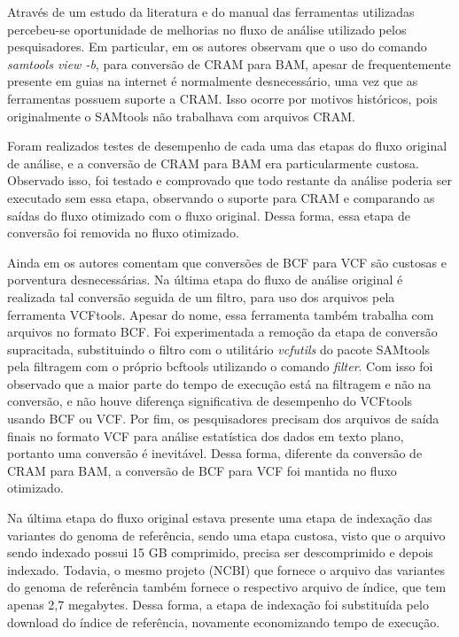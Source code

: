 \documentclass[cic,tc]{iiufrgs}
\begin{document}
Através de um estudo da literatura e do manual das ferramentas utilizadas
percebeu-se oportunidade de melhorias no fluxo de análise utilizado pelos
pesquisadores. Em particular, em \cite{danecek2021twelve} os autores observam
que o uso do comando \textit{samtools view -b}, para conversão de CRAM para
BAM, apesar de frequentemente presente em guias na internet é normalmente
desnecessário, uma vez que as ferramentas possuem suporte a CRAM. Isso ocorre
por motivos históricos, pois originalmente o SAMtools não trabalhava com
arquivos CRAM.\cite{danecek2021twelve}

Foram realizados testes de desempenho de cada uma das etapas do fluxo original
de análise, e a conversão de CRAM para BAM era particularmente custosa.
Observado isso, foi testado e comprovado que todo restante da análise poderia
ser executado sem essa etapa, observando o suporte para CRAM e comparando as
saídas do fluxo otimizado com o fluxo original. Dessa forma, essa etapa de
conversão foi removida no fluxo otimizado.

Ainda em \cite{danecek2021twelve} os autores comentam que conversões de BCF
para VCF são custosas e porventura desnecessárias. Na última etapa do fluxo de
análise original é realizada tal conversão seguida de um filtro, para uso dos
arquivos pela ferramenta VCFtools. Apesar do nome, essa ferramenta também
trabalha com arquivos no formato BCF.\cite{man2015vcftools} Foi experimentada a
remoção da etapa de conversão supracitada, substituindo o filtro com o
utilitário \textit{vcfutils} do pacote SAMtools pela filtragem com o próprio
bcftools utilizando o comando \textit{filter}. Com isso foi observado que a
maior parte do tempo de execução está na filtragem e não na conversão, e não
houve diferença significativa de desempenho do VCFtools usando BCF ou VCF. Por
fim, os pesquisadores precisam dos arquivos de saída finais no formato VCF para
análise estatística dos dados em texto plano, portanto uma conversão é
inevitável. Dessa forma, diferente da conversão de CRAM para BAM, a conversão
de BCF para VCF foi mantida no fluxo otimizado.

Na última etapa do fluxo original estava presente uma etapa de indexação das
variantes do genoma de referência, sendo uma etapa custosa, visto que o arquivo
sendo indexado possui 15 GB comprimido, precisa ser descomprimido e depois
indexado. Todavia, o mesmo projeto (NCBI) que fornece o arquivo das variantes
do genoma de referência também fornece o respectivo arquivo de índice, que tem
apenas 2,7 megabytes. Dessa forma, a etapa de indexação foi substituída pelo
download do índice de referência, novamente economizando tempo de execução.
\end{document}
